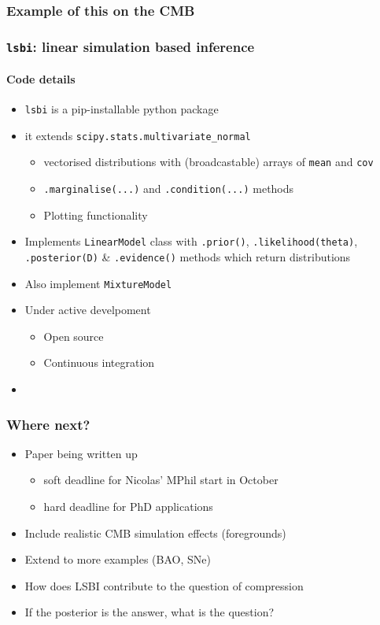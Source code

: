 \documentclass[aspectratio=169]{beamer}
\begin{document}
\begin{frame}
    \frametitle{Example of this on the CMB}
\end{frame}

\begin{frame}
    \frametitle{\texttt{lsbi}: linear simulation based inference}
    \framesubtitle{Code details}
    \begin{itemize}
        \item \texttt{lsbi} is a pip-installable python package
        \item it extends \texttt{scipy.stats.multivariate\_normal}
            \begin{itemize}
                \item vectorised distributions with (broadcastable) arrays of \texttt{mean} and \texttt{cov}
                \item \texttt{.marginalise(...)} and \texttt{.condition(...)} methods
                \item Plotting functionality
            \end{itemize}
        \item Implements \texttt{LinearModel} class with \texttt{.prior()}, \texttt{.likelihood(theta)}, \texttt{.posterior(D)} \& \texttt{.evidence()} methods which return distributions
        \item Also implement \texttt{MixtureModel}
        \item Under active develpoment
            \begin{itemize}
                \item Open source
                \item Continuous integration
            \end{itemize}
        \item {}
    \end{itemize}

\end{frame}

\begin{frame}
    \frametitle{Where next?}
    \begin{itemize}
        \item Paper being written up 
            \begin{itemize}
                \item soft deadline for Nicolas' MPhil start in October
                \item hard deadline for PhD applications
            \end{itemize}
        \item Include realistic CMB simulation effects (foregrounds)
        \item Extend to more examples (BAO, SNe)
        \item How does LSBI contribute to the question of compression
        \item If the posterior is the answer, what is the question?
    \end{itemize}
\end{frame}
\end{document}
